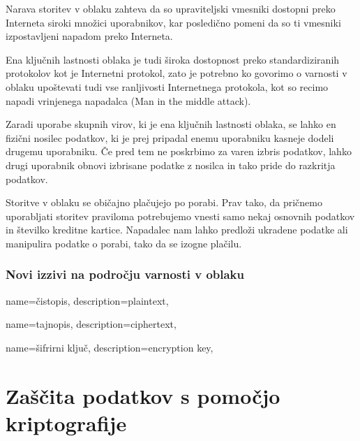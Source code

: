 \documentclass[12pt,a4paper,openany]{book}
\begin{document}
\begin{description}[style=nextline]

\item[Nedovoljen dostop do upraviteljskega in programskega vmesnika] Narava storitev v oblaku zahteva da so upraviteljski vmesniki dostopni preko Interneta siroki množici uporabnikov, kar posledično pomeni da so ti vmesniki izpostavljeni napadom preko Interneta.

\item[Ranljivosti internetnega protokola] Ena ključnih lastnosti oblaka je tudi široka dostopnost preko standardiziranih protokolov kot je Internetni protokol, zato je potrebno ko govorimo o varnosti v oblaku upoštevati tudi vse ranljivosti Internetnega protokola, kot so recimo napadi vrinjenega napadalca (Man in the middle attack).

\item[Ranljivosti obnovitve podatkov] Zaradi uporabe skupnih virov, ki je ena ključnih lastnosti oblaka, se lahko en fizični nosilec podatkov, ki je prej pripadal enemu uporabniku kasneje dodeli drugemu uporabniku. Če pred tem ne poskrbimo za varen izbris podatkov, lahko drugi uporabnik obnovi izbrisane podatke z nosilca in tako pride do razkritja podatkov.

\item[Izogibanje merjenju in plačilu] Storitve v oblaku se običajno plačujejo po porabi. Prav tako, da pričnemo uporabljati storitev praviloma potrebujemo vnesti samo nekaj osnovnih podatkov in številko kreditne kartice. Napadalec nam lahko predloži ukradene podatke ali manipulira podatke o porabi, tako da se izogne plačilu.

\end{description}

\subsection{Novi izzivi na področju varnosti v oblaku}


{
  name=čistopis,
  description={plaintext},
}


{
  name=tajnopis,
  description={ciphertext},
}

{
  name=šifrirni ključ,
  description={encryption key},
}


\chapter{Zaščita podatkov s pomočjo kriptografije}
\end{document}
